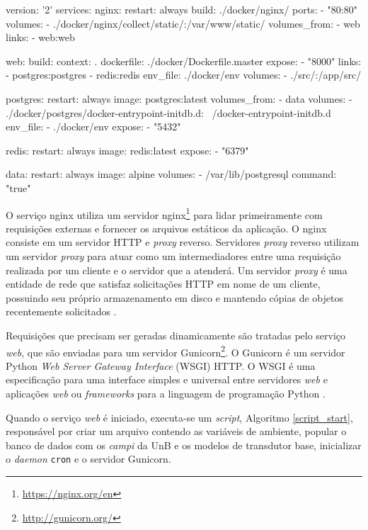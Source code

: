 \begin{python}[caption={Serviços providos pelo Docker Compose.}, captionpos=b, label={compose_docker}]
version: '2'
services:
  nginx:
    restart: always
    build: ./docker/nginx/
    ports:
      - "80:80"
    volumes:
      - ./docker/nginx/collect/static/:/var/www/static/
    volumes_from:
      - web
    links:
      - web:web

  web:
    build:
      context: .
      dockerfile: ./docker/Dockerfile.master
    expose:
      - "8000"
    links:
      - postgres:postgres
      - redis:redis
    env_file: ./docker/env
    volumes:
      - ./src/:/app/src/

  postgres:
    restart: always
    image: postgres:latest
    volumes_from:
      - data
    volumes:
      - ./docker/postgres/docker-entrypoint-initdb.d: \
         /docker-entrypoint-initdb.d
    env_file:
      - ./docker/env
    expose:
      - "5432"

  redis:
    restart: always
    image: redis:latest
    expose:
      - "6379"

  data:
    restart: always
    image: alpine
    volumes:
      - /var/lib/postgresql
    command: "true"
\end{python}

O serviço nginx utiliza um servidor nginx\footnote{\url{https://nginx.org/en}} para lidar primeiramente com requisições externas e fornecer os arquivos estáticos da aplicação. O nginx consiste em um servidor HTTP e \textit{proxy} reverso. Servidores \textit{proxy} reverso utilizam um servidor \textit{proxy} para atuar como um intermediadores entre uma requisição realizada por um cliente e o servidor que a atenderá. Um servidor \textit{proxy} é uma entidade de rede que satisfaz solicitações HTTP em nome de um cliente, possuindo seu próprio armazenamento em disco e mantendo cópias de objetos recentemente solicitados \cite{kurose_2002}.

Requisições que precisam ser geradas dinamicamente são tratadas pelo serviço \textit{web}, que são enviadas para um servidor Gunicorn\footnote{\url{http://gunicorn.org/}}. O Gunicorn é um servidor Python \textit{Web Server Gateway Interface} (WSGI) HTTP. O WSGI é uma especificação para uma interface simples e universal entre servidores \textit{web} e aplicações \textit{web} ou \textit{frameworks} para a linguagem de programação Python \cite{pep_333}.

Quando o serviço \textit{web} é iniciado, executa-se um \textit{script}, Algoritmo \ref{script_start}, responsável por criar um arquivo contendo as variáveis de ambiente, popular o banco de dados com os \textit{campi} da UnB e os modelos de transdutor base, inicializar o \textit{daemon} \verb|cron| e o servidor Gunicorn.

